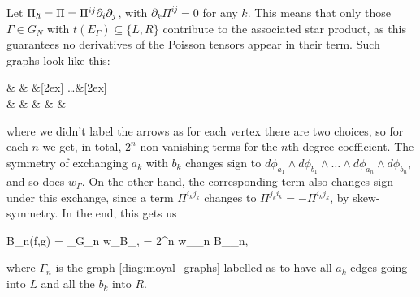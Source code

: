 \begin{example}
	Let $\Pi_{\boldsymbol\hslash} = \Pi = \Pi^{ij} \partial_i \partial_j$, with $\partial_k \Pi^{ij} = 0$ for any $k$. This means that only those $\Gamma \in G_N$ with $t(E_\Gamma) \subseteq \{L,R\}$ contribute to the associated star product, as this guarantees no derivatives of the Poisson tensors appear in their term. Such graphs look like this:
	\begin{diagram}
	\label{diag:moyal_graphs}
		\& \bullet {}  \& \bullet {}  \&[2ex] \dots \&[2ex] \bullet {} \\
		\bullet \& \& \& \& \& \bullet
	\end{diagram}
	where we didn't label the arrows as for each vertex there are two choices, so for each $n$ we get, in total, $2^n$ non-vanishing terms for the $n$th degree coefficient. The symmetry of exchanging $a_k$ with $b_k$ changes sign to $d\phi_{a_1} \wedge d \phi_{b_1} \wedge \ldots \wedge d\phi_{a_n} \wedge d\phi_{b_n}$, and so does $w_\Gamma$. On the other hand, the corresponding term also changes sign under this exchange, since a term $\Pi^{i_kj_k}$ changes to $\Pi^{j_ki_k} = - \Pi^{i_kj_k}$, by skew-symmetry. In the end, this gets us
	\begin{eqalign}
		B_n(f,g) =  \sum_{\Gamma \in G_n} w_\Gamma B_{\Gamma, \Pi} = 2^n w_{\Gamma_n} B_{\Gamma_n,\Pi}
	\end{eqalign}
	where $\Gamma_n$ is the graph \eqref{diag:moyal_graphs} labelled as to have all $a_k$ edges going into $L$ and all the $b_k$ into $R$.


\end{example}
